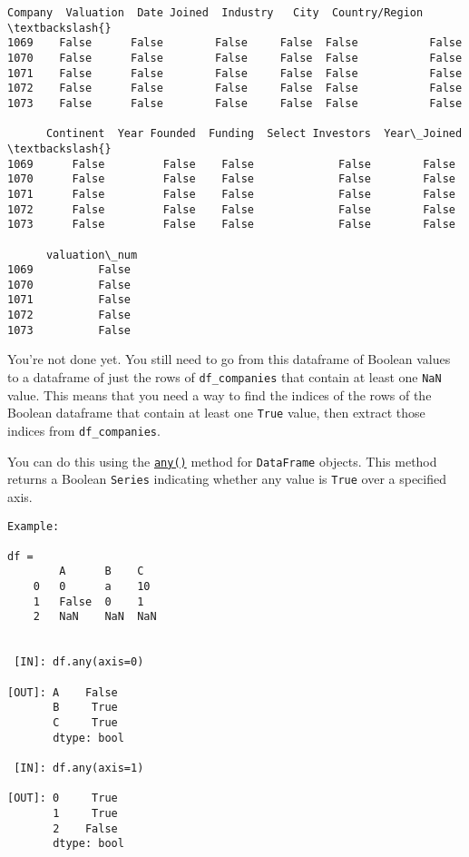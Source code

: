 \documentclass[11pt]{article}
\makeatletter
\newcommand{\boxspacing}{\kern\kvtcb@left@rule\kern\kvtcb@boxsep}
\newcommand{\prompt}[4]{
        \ttfamily\llap{{\color{#2}[#3]:\hspace{3pt}#4}}\vspace{-\baselineskip}
    }
\makeatother
\begin{document}
            \begin{tcolorbox}[breakable, size=fbox, boxrule=.5pt, pad at break*=1mm, opacityfill=0]
\prompt{Out}{outcolor}{11}{\boxspacing}
\begin{Verbatim}[commandchars=\\\{\}]
      Company  Valuation  Date Joined  Industry   City  Country/Region  \textbackslash{}
1069    False      False        False     False  False           False
1070    False      False        False     False  False           False
1071    False      False        False     False  False           False
1072    False      False        False     False  False           False
1073    False      False        False     False  False           False

      Continent  Year Founded  Funding  Select Investors  Year\_Joined  \textbackslash{}
1069      False         False    False             False        False
1070      False         False    False             False        False
1071      False         False    False             False        False
1072      False         False    False             False        False
1073      False         False    False             False        False

      valuation\_num
1069          False
1070          False
1071          False
1072          False
1073          False
\end{Verbatim}
\end{tcolorbox}
        
    You're not done yet. You still need to go from this dataframe of Boolean
values to a dataframe of just the rows of \texttt{df\_companies} that
contain at least one \texttt{NaN} value. This means that you need a way
to find the indices of the rows of the Boolean dataframe that contain at
least one \texttt{True} value, then extract those indices from
\texttt{df\_companies}.

You can do this using the
\href{https://pandas.pydata.org/docs/reference/api/pandas.DataFrame.any.html}{\texttt{any()}}
method for \texttt{DataFrame} objects. This method returns a Boolean
\texttt{Series} indicating whether any value is \texttt{True} over a
specified axis.

\begin{verbatim}
Example:

df =     
        A      B    C
    0   0      a    10
    1   False  0    1
    2   NaN    NaN  NaN


 [IN]: df.any(axis=0)

[OUT]: A    False
       B     True
       C     True
       dtype: bool
       
 [IN]: df.any(axis=1)
 
[OUT]: 0     True
       1     True
       2    False
       dtype: bool
\end{verbatim}
\end{document}
